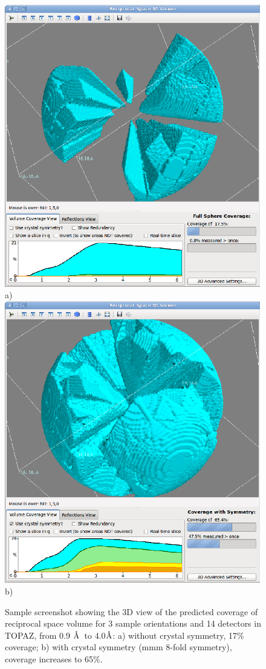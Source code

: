 \documentclass[final]{iucr}              %
\newcommand{\ang}{$\mathrm{\AA} $}
\begin{document}
\begin{figure}
\caption{Sample screenshot showing the 3D view of the predicted coverage of
reciprocal space volume for 3 sample orientations and 14 detectors in TOPAZ, from 0.9 \ang\ to 4.0\ang:
a) without crystal symmetry, 17\% coverage; b) with crystal symmetry (mmm 8-fold
symmetry), coverage increases to 65\%. }
\includegraphics{volume_nosym.eps}
a)
\includegraphics{volume_sym.eps}
b)
\label{fig:volume_view}
\end{figure}
\end{document}
